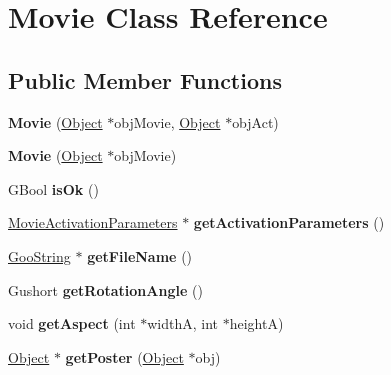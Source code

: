 \hypertarget{class_movie}{}\section{Movie Class Reference}
\label{class_movie}
\subsection*{Public Member Functions}
\begin{DoxyCompactItemize}
\item 
\mbox{\label{class_movie_a2b1e8b859fd0c7eb67ec80d66c615d5d}} 
{\bfseries Movie} (\hyperlink{class_object}{Object} $\ast$obj\+Movie, \hyperlink{class_object}{Object} $\ast$obj\+Act)
\item 
\mbox{\label{class_movie_ab7356f6313c99d08084f3a84d9a4cb5e}} 
{\bfseries Movie} (\hyperlink{class_object}{Object} $\ast$obj\+Movie)
\item 
\mbox{\label{class_movie_a27ac37a24c38b7ed2fc9f7285c77e3f5}} 
G\+Bool {\bfseries is\+Ok} ()
\item 
\mbox{\label{class_movie_adddc47376341a5d05e0f383fbb13f75f}} 
\hyperlink{struct_movie_activation_parameters}{Movie\+Activation\+Parameters} $\ast$ {\bfseries get\+Activation\+Parameters} ()
\item 
\mbox{\label{class_movie_a11328af34c11e44f7feffd5759fa6e38}} 
\hyperlink{class_goo_string}{Goo\+String} $\ast$ {\bfseries get\+File\+Name} ()
\item 
\mbox{\label{class_movie_ae5e9c3e1a7b722a85c73496ecfe8afaa}} 
Gushort {\bfseries get\+Rotation\+Angle} ()
\item 
\mbox{\label{class_movie_afe43b7138dfe2b36ebf6d0d3bbea242e}} 
void {\bfseries get\+Aspect} (int $\ast$widthA, int $\ast$heightA)
\item 
\mbox{\label{class_movie_a348b500af203614147ae5345b96b7e42}} 
\hyperlink{class_object}{Object} $\ast$ {\bfseries get\+Poster} (\hyperlink{class_object}{Object} $\ast$obj)
\item 
\mbox{\label{class_movie_a8a5b4b8549fd758f465bd21aec07501d}} 

\end{DoxyCompactItemize}
